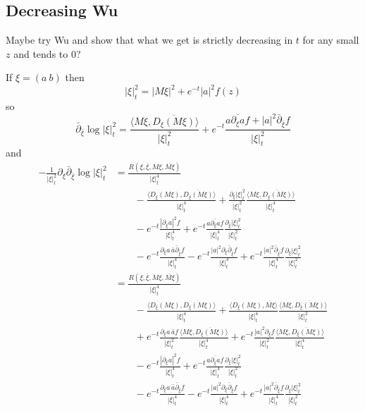 \documentclass[10pt,a4paper]{amsart}
\def\<{\langle}
\def\>{\rangle}
\def\ov#1{\overline{#1}}
\def\p{\partial}
\begin{document}
\subsection*{Decreasing Wu}

Maybe try Wu and show that what we get is strictly decreasing in $t$ for any
small $z$ and tends to $0$?

If $\xi = (a\ b)$ then
$$
|
\xi
|^2_t
= |M \xi|^2 + e^{-t} |a|^2 f(z)
$$
so
$$
\bar\partial_{\bar \xi} \log |\xi|^2_t
= \frac{\< M\xi, \ov{D_{\xi}(M\xi)}\>}{|\xi|^2_t}
+ e^{-t} \frac{a \ov{\partial_\xi a} f + |a|^2 \bar\partial_{\bar\xi} f}{|\xi|^2_t}
$$
and
\begin{align*}
-\frac{1}{|\xi|^2_t}
\partial_\xi \bar\partial_{\bar \xi} \log |\xi|^2_t
&=
\frac{R(\xi, \ov\xi, M\xi, \ov{M\xi})}{|\xi|^4_t}
\\
&\qquad
- \frac{\< D_\xi(M\xi), \ov{D_{\xi}(M\xi)}\>}{|\xi|^4_t}
+ \frac{\partial_\xi |\xi|^2_t}{|\xi|^2_t}
\frac{\< M\xi, \ov{D_{\xi}(M\xi)}\>}{|\xi|^4_t}
\\
&\qquad
- e^{-t} \frac{|\partial_\xi a|^2 f}{|\xi|^4_t}
+ e^{-t} \frac{a \ov{\partial_\xi a} f}{|\xi|^4_t}
\frac{\partial_\xi |\xi|^2_t}{|\xi|^2_t}
\\
&\qquad
- e^{-t} \frac{\partial_\xi a \, \bar a \bar\partial_{\bar\xi} f}{|\xi|^4_t}
- e^{-t} \frac{|a|^2 \partial_\xi \bar\partial_{\bar\xi} f}{|\xi|^4_t}
+ e^{-t} \frac{|a|^2 \bar\partial_{\bar\xi} f}{|\xi|^4_t}
\frac{\partial_\xi |\xi|^2_t}{|\xi|^2_t}
\\
&=
\frac{R(\xi, \ov\xi, M\xi, \ov{M\xi})}{|\xi|^4_t}
\\
&\qquad
- \frac{\< D_\xi(M\xi), \ov{D_{\xi}(M\xi)}\>}{|\xi|^4_t}
+ \frac{\< D_\xi(M\xi), \ov{M\xi}\>}{|\xi|^4_t}
\frac{\< M\xi, \ov{D_{\xi}(M\xi)}\>}{|\xi|^2_t}
\\
&\qquad
+
e^{-t} \frac{\p_\xi a \, \bar a f}{|\xi|_t^2}
\frac{\< M\xi, \ov{D_{\xi}(M\xi)}\>}{|\xi|^4_t}
+ e^{-t} \frac{|a|^2 \p_\xi f}{|\xi|_t^2}
\frac{\< M\xi, \ov{D_{\xi}(M\xi)}\>}{|\xi|^4_t}
\\
&\qquad
- e^{-t} \frac{|\partial_\xi a|^2 f}{|\xi|^4_t}
+ e^{-t} \frac{a \ov{\partial_\xi a} f}{|\xi|^4_t}
\frac{\partial_\xi |\xi|^2_t}{|\xi|^2_t}
\\
&\qquad
- e^{-t} \frac{\partial_\xi a \, \bar a \bar\partial_{\bar\xi} f}{|\xi|^4_t}
- e^{-t} \frac{|a|^2 \partial_\xi \bar\partial_{\bar\xi} f}{|\xi|^4_t}
+ e^{-t} \frac{|a|^2 \bar\partial_{\bar\xi} f}{|\xi|^4_t}
\frac{\partial_\xi |\xi|^2_t}{|\xi|^2_t}
\end{align*}
\end{document}
